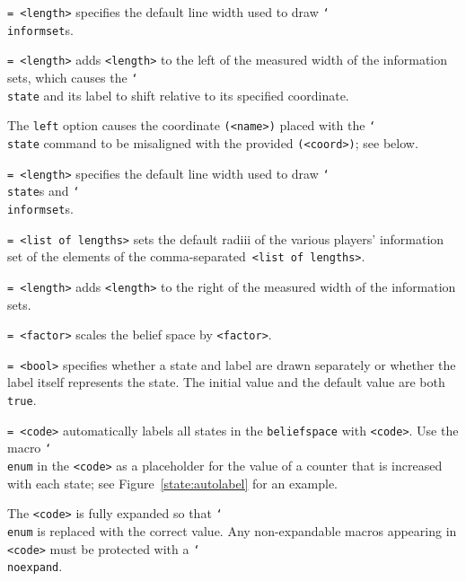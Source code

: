 \documentclass{article}
\newenvironment{desc}{\itemize[leftmargin=50pt]}{\enditemize}
\def\option#1#2{\item[\texttt{#1}] \hskip-1.5pt\texttt{#2}}
\renewcommand{\textbackslash}{\char`\\}
\def\cmd#1{\texttt{\color{cmd}\textbackslash#1}}
\begin{document}
\begin{desc}
\option{inform line width}{= <length>} specifies the default line width used to draw \cmd{informset}s.


\option{left}{= <length>} adds \texttt{<length>} to the left of the measured width of the information sets, which causes the \cmd{state} and its label to shift relative to its specified coordinate.

{\color{player4}The \texttt{left} option causes the coordinate \texttt{(<name>)} placed with the \cmd{state} command to be misaligned with the provided \texttt{(<coord>)}; see below.}%

\option{line width}{= <length>} specifies the default line width used to draw \cmd{state}s and \cmd{informset}s.

\option{radius}{= <list of lengths>} sets the default radiii of the various players' information set of the elements of the comma-separated~\texttt{<list of lengths>}.

\option{right}{= <length>} adds \texttt{<length>} to the right of the measured width of the information sets.

\option{scale}{= <factor>} scales the belief space by \texttt{<factor>}.

\option{state}{= <bool>} specifies whether a state and label are drawn separately or whether the label itself represents the state. The initial value and the default value are both \texttt{true}.

\option{state autolabel}{= <code>} automatically labels all states in the \texttt{beliefspace} with \texttt{<code>}. Use the macro \cmd{enum} in the \texttt{<code>} as a placeholder for the value of a counter that is increased with each state; see Figure~\ref{state:autolabel} for an example.

{\color{player4}The \texttt{<code>} is fully expanded so that \cmd{enum} is replaced with the correct value. Any non-expandable macros appearing in \texttt{<code>} must be protected with a \cmd{noexpand}.}


\end{desc}
\end{document}
